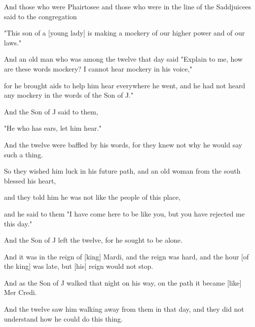 \Sentence
{ \hX{} }
{ \eX{} }
{
And those who were Phairtosee and those who were in the line of the Saddjuicees said to the congregation
}

\Sentence
{ \hX{} }
{ \eX{} }
{
"This son of a [young lady] is making a mockery of our higher power and of our laws."
}

\Sentence
{ \hX{} }
{ \eX{} }
{
And an old man who was among the twelve that day said "Explain to me, how are these words mockery? I cannot hear mockery in his voice,"
}

\Sentence
{ \hX{} }
{ \eX{} }
{
for he brought aids to help him hear everywhere he went, and he had not heard any mockery in the words of the Son of J."
}

\Sentence
{ \hX{} }
{ \eX{} }
{
And the Son of J said to them,
}

\Sentence
{ \hX{} }
{ \eX{} }
{
"He who has ears, let him hear."
}

\Sentence
{ \hX{} }
{ \eX{} }
{
And the twelve were baffled by his words, for they knew not why he would say such a thing.
}

\Sentence
{ \hX{} }
{ \eX{} }
{
So they wished him luck in his future path, and an old woman from the south blessed his heart,
}

\Sentence
{ \hX{} }
{ \eX{} }
{
and they told him he was not like the people of this place,
}

\Sentence
{ \hX{} }
{ \eX{} }
{
and he said to them "I have come here to be like you, but you have rejected me this day."
}

\Sentence
{ \hX{} }
{ \eX{} }
{
And the Son of J left the twelve, for he sought to be alone.
}

\Sentence
{ \hX{} }
{ \eX{} }
{
And it was in the reign of [king] Mardi, and the reign was hard, and the hour [of the king] was late, but [his] reign would not stop.
}

\Sentence
{ \hX{} }
{ \eX{} }
{
And as the Son of J walked that night on his way, on the path it became [like] Mer Credi.
}

\Sentence
{ \hX{} }
{ \eX{} }
{
And the twelve saw him walking away from them in that day, and they did not understand how he could do this thing.
}

